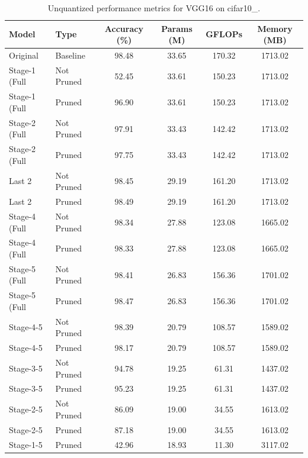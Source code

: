 \begin{table}
\caption{Unquantized performance metrics for VGG16 on cifar10_.}
\label{tab:VGG16_cifar10__unquant}
\begin{tabular}{llcccc}
\toprule
Model & Type & Accuracy (\%) & Params (M) & GFLOPs & Memory (MB) \\
\midrule
Original & Baseline & 98.48 & 33.65 & 170.32 & 1713.02 \\
Stage-1 (Full & Not Pruned & 52.45 & 33.61 & 150.23 & 1713.02 \\
Stage-1 (Full & Pruned & 96.90 & 33.61 & 150.23 & 1713.02 \\
Stage-2 (Full & Not Pruned & 97.91 & 33.43 & 142.42 & 1713.02 \\
Stage-2 (Full & Pruned & 97.75 & 33.43 & 142.42 & 1713.02 \\
Last 2 & Not Pruned & 98.45 & 29.19 & 161.20 & 1713.02 \\
Last 2 & Pruned & 98.49 & 29.19 & 161.20 & 1713.02 \\
Stage-4 (Full & Not Pruned & 98.34 & 27.88 & 123.08 & 1665.02 \\
Stage-4 (Full & Pruned & 98.33 & 27.88 & 123.08 & 1665.02 \\
Stage-5 (Full & Not Pruned & 98.41 & 26.83 & 156.36 & 1701.02 \\
Stage-5 (Full & Pruned & 98.47 & 26.83 & 156.36 & 1701.02 \\
Stage-4-5 & Not Pruned & 98.39 & 20.79 & 108.57 & 1589.02 \\
Stage-4-5 & Pruned & 98.17 & 20.79 & 108.57 & 1589.02 \\
Stage-3-5 & Not Pruned & 94.78 & 19.25 & 61.31 & 1437.02 \\
Stage-3-5 & Pruned & 95.23 & 19.25 & 61.31 & 1437.02 \\
Stage-2-5 & Not Pruned & 86.09 & 19.00 & 34.55 & 1613.02 \\
Stage-2-5 & Pruned & 87.18 & 19.00 & 34.55 & 1613.02 \\
Stage-1-5 & Pruned & 42.96 & 18.93 & 11.30 & 3117.02 \\
\bottomrule
\end{tabular}
\end{table}
